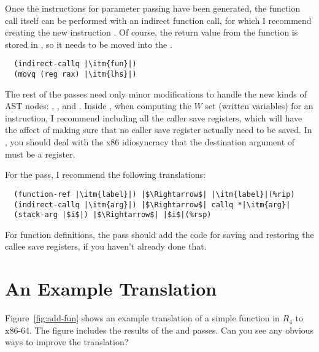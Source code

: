 \documentclass[11pt]{book}
\begin{document}
Once the instructions for parameter passing have been generated, the
function call itself can be performed with an indirect function call,
for which I recommend creating the new instruction
. Of course, the return value from the function
is stored in , so it needs to be moved into the .
\begin{lstlisting}
  (indirect-callq |\itm{fun}|)
  (movq (reg rax) |\itm{lhs}|)
\end{lstlisting}

The rest of the passes need only minor modifications to handle the new
kinds of AST nodes: , , and
. Inside , when computing the $W$ set
(written variables) for an  instruction, I
recommend including all the caller save registers, which will have the
affect of making sure that no caller save register actually need to be
saved. In , you should deal with the x86
idiosyncracy that the destination argument of  must be a
register.

For the  pass, I recommend the following translations:
\begin{lstlisting}
  (function-ref |\itm{label}|) |$\Rightarrow$| |\itm{label}|(%rip)
  (indirect-callq |\itm{arg}|) |$\Rightarrow$| callq *|\itm{arg}|
  (stack-arg |$i$|) |$\Rightarrow$| |$i$|(%rsp)
\end{lstlisting}
For function definitions, the  pass should add the
code for saving and restoring the callee save registers, if you
haven't already done that.

\section{An Example Translation}

Figure~\ref{fig:add-fun} shows an example translation of a simple
function in $R_4$ to x86-64. The figure includes the results of the
 and  passes.  Can you see any
obvious ways to improve the translation?
\end{document}

